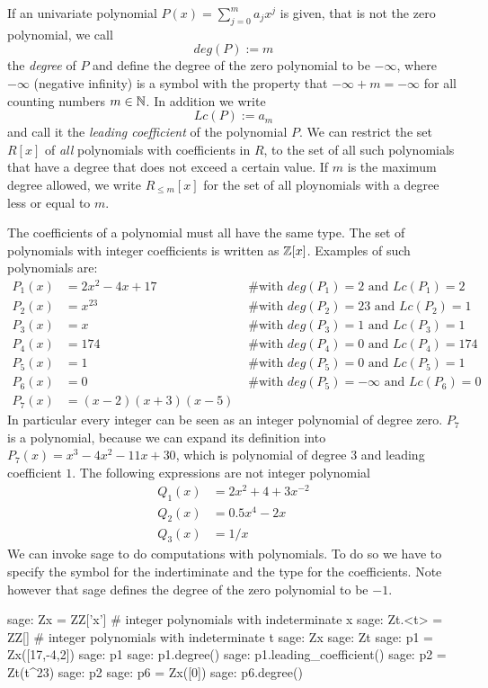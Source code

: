 If an univariate polynomial $P(x)=\sum_{j=0}^m a_jx^j$ is given, that is not the zero polynomial, we call 
\begin{equation}
deg(P):=m
\end{equation}
the \textit{degree} of $P$ and define the degree of the zero polynomial to be $-\infty$, where $-\infty$ (negative infinity) is a symbol with the property that $-\infty + m = -\infty$ for all counting numbers $m\in\mathbb{N}$. In addition we write 
\begin{equation}
\label{def_leading_coefficient}
Lc(P):=a_m
\end{equation}
and call it the \textit{leading coefficient} of the polynomial $P$. We can restrict the set $R[x]$ of \textit{all} polynomials with coefficients in $R$, to the set of all such polynomials that have a degree that does not exceed a certain value. If $m$ is the maximum degree allowed, we write $R_{\leq m}[x]$ for the set of all ploynomials with a degree less or equal to $m$.
\begin{example} The coefficients of a polynomial must all have the same type. The set of polynomials with integer coefficients is written as $\mathbb{Z}[x]$. Examples of such polynomials are:
\begin{align*}
P_1(x) &= 2x^2 -4x +17 & \text{ \# with } deg(P_1)=2 \text{ and } Lc(P_1)=2\\
P_2(x) &= x^{23} & \text{ \# with } deg(P_2)=23 \text{ and } Lc(P_2)=1\\
P_3(x) &= x & \text{ \# with }  deg(P_3)=1 \text{ and } Lc(P_3)=1\\
P_4(x) &= 174 & \text{ \# with }  deg(P_4)=0 \text{ and } Lc(P_4)=174\\
P_5(x) &= 1 & \text{ \# with }  deg(P_5)=0 \text{ and } Lc(P_5)=1\\
P_6(x) &= 0 & \text{ \# with }  deg(P_5)=-\infty \text{ and } Lc(P_6)=0\\
P_7(x) &= (x-2)(x+3)(x-5)
\end{align*}
In particular every integer can be seen as an integer polynomial of degree zero. $P_7$ is a polynomial, because we can expand its definition into $P_7(x)=x^3 - 4 x^2 - 11 x + 30$, which is polynomial of degree $3$ and leading coefficient $1$. The following expressions are not integer polynomial
\begin{align*}
Q_1(x) &= 2x^2 + 4 + 3x^{-2}\\
Q_2(x) &= 0.5x^4 -2x\\
Q_3(x) &=1/x
\end{align*}
We can invoke sage to do computations with polynomials. To do so we have to specify the symbol for the indertiminate and the type for the coefficients. Note however that sage defines the degree of the zero polynomial to be $-1$.
\begin{sagecommandline}
sage: Zx = ZZ['x'] # integer polynomials with indeterminate x
sage: Zt.<t> = ZZ[] # integer polynomials with indeterminate t
sage: Zx
sage: Zt
sage: p1 = Zx([17,-4,2])
sage: p1
sage: p1.degree()
sage: p1.leading_coefficient()
sage: p2 = Zt(t^23)
sage: p2
sage: p6 = Zx([0])
sage: p6.degree()
\end{sagecommandline}
\end{example}
